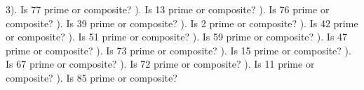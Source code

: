 \documentclass{article}%
\begin{document}
3). Is 77 prime or composite?%
\newline%
\newline%
). Is 13 prime or composite?%
\newline%
\newline%
). Is 76 prime or composite?%
\newline%
\newline%
). Is 39 prime or composite?%
\newline%
\newline%
). Is 2 prime or composite?%
\newline%
\newline%
). Is 42 prime or composite?%
\newline%
\newline%
). Is 51 prime or composite?%
\newline%
\newline%
). Is 59 prime or composite?%
\newline%
\newline%
). Is 47 prime or composite?%
\newline%
\newline%
). Is 73 prime or composite?%
\newline%
\newline%
). Is 15 prime or composite?%
\newline%
\newline%
). Is 67 prime or composite?%
\newline%
\newline%
). Is 72 prime or composite?%
\newline%
\newline%
). Is 11 prime or composite?%
\newline%
\newline%
). Is 85 prime or composite?%
\newline%
\end{document}
